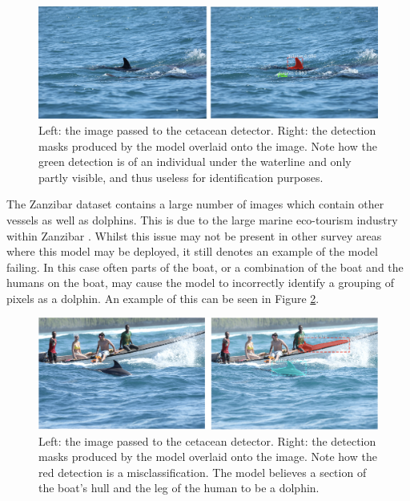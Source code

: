 \begin{figure}[h]
	\begin{center}
		\includegraphics[scale=0.6]{Chapter3/figs/model-fail-underwater.png}
	\end{center}
	\caption[Left: the image passed to the cetacean detector. Right: the detection masks produced by the model overlaid onto the image.]{Left: the image passed to the cetacean detector. Right: the detection masks produced by the model overlaid onto the image. Note how the green detection is of an individual under the waterline and only partly visible, and thus useless for identification purposes. }
	\label{fig:model-fail-underwater}
\end{figure}

The Zanzibar dataset contains a large number of images which contain other vessels as well as dolphins. This is due to the large marine eco-tourism industry within Zanzibar \cite{sharpe_indian_2019, berggren_sustainable_2007}. Whilst this issue may not be present in other survey areas where this model may be deployed, it still denotes an example of the model failing. In this case often parts of the boat, or a combination of the boat and the humans on the boat, may cause the model to incorrectly identify a grouping of pixels as a dolphin. An example of this can be seen in Figure \ref{fig:model-fail-boat}.
 
\begin{figure}[h]
	\begin{center}
		\includegraphics[scale=0.6]{Chapter3/figs/model-fail-boat.png}
	\end{center}
	\caption[Left: the image passed to the cetacean detector. Right: the detection masks produced by the model overlaid onto the image.]{Left: the image passed to the cetacean detector. Right: the detection masks produced by the model overlaid onto the image. Note how the red detection is a misclassification. The model believes a section of the boat's hull and the leg of the human to be a dolphin.}
	\label{fig:model-fail-boat}
\end{figure}

